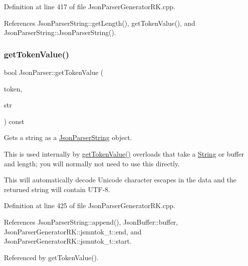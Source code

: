 Definition at line 417 of file Json\+Parser\+Generator\+R\+K.\+cpp.



References Json\+Parser\+String\+::get\+Length(), get\+Token\+Value(), and Json\+Parser\+String\+::\+Json\+Parser\+String().

\mbox{\label{class_json_parser_a6942f718b6b73d2ff1611f55aec8569c}} 
\subsubsection{\texorpdfstring{get\+Token\+Value()}{getTokenValue()}\hspace{0.1cm}{\footnotesize\ttfamily [8/8]}}
{\footnotesize\ttfamily bool Json\+Parser\+::get\+Token\+Value (\begin{DoxyParamCaption}\item[{const \hyperlink{struct_json_parser_generator_r_k_1_1jsmntok__t}{Json\+Parser\+Generator\+R\+K\+::jsmntok\+\_\+t} $\ast$}]{token,  }\item[{\hyperlink{class_json_parser_string}{Json\+Parser\+String} \&}]{str }\end{DoxyParamCaption}) const}



Gets a string as a \hyperlink{class_json_parser_string}{Json\+Parser\+String} object. 

This is used internally by \hyperlink{class_json_parser_a5f9e5c2453307a99a54fcf26fbd68dd4}{get\+Token\+Value()} overloads that take a \hyperlink{class_string}{String} or buffer and length; you will normally not need to use this directly.

This will automatically decode Unicode character escapes in the data and the returned string will contain U\+T\+F-\/8. 

Definition at line 425 of file Json\+Parser\+Generator\+R\+K.\+cpp.



References Json\+Parser\+String\+::append(), Json\+Buffer\+::buffer, Json\+Parser\+Generator\+R\+K\+::jsmntok\+\_\+t\+::end, and Json\+Parser\+Generator\+R\+K\+::jsmntok\+\_\+t\+::start.



Referenced by get\+Token\+Value().

\mbox{\label{class_json_parser_af1f4a3a65b5cc9cd19b129c410aa78e0}} 
